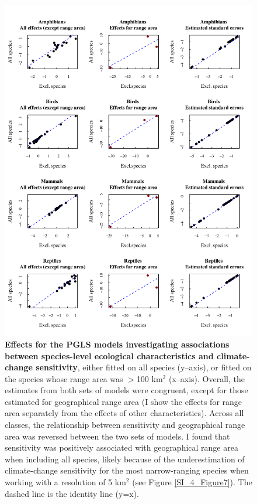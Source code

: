 \begin{figure}[h!]
\centering
\includegraphics[scale=0.9, trim={0 0 5.5cm 0}, clip]{Supporting/Chapter4/Figures/ClimateChangeModelsEstimates.pdf}
\caption[Effects for the PGLS models investigating associations between species-level ecological characteristics and climate-change sensitivity, either fitted on all species (y--axis), or fitted on the species whose range area was $>$100 km$^2$ (x--axis)]{\textbf{Effects for the PGLS models investigating associations between species-level ecological characteristics and climate-change sensitivity}, either fitted on all species (y--axis), or fitted on the species whose range area was $>$100 km$^2$ (x--axis). Overall, the estimates from both sets of models were congruent, except for those estimated for geographical range area (I show the effects for range area separately from the effects of other characteristics). Across all classes, the relationship between sensitivity and geographical range area was reversed between the two sets of models. I found that sensitivity was positively associated with geographical range area when including all species, likely because of the underestimation of climate-change sensitivity for the most narrow-ranging species when working with a resolution of 5 km$^2$ (see Figure \ref{SI_4_Figure7}). The dashed line is the identity line (y=x).}
\label{SI_4_Figure_22}
\end{figure}

